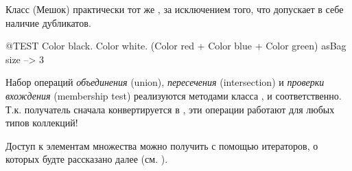 \documentclass[a4paper,10pt,twoside]{book}
\begin{document}
Класс  (Мешок) практически тот же , за исключением того, что допускает в себе наличие дубликатов.
\begin{code}{@TEST}
{ Color black. Color white. (Color red + Color blue + Color green) } asBag size --> 3
\end{code}

Набор операций \emph{объединения} (union), \emph{пересечения} (intersection) и \emph{проверки вхождения} (membership test) реализуются методами класса  ,  и  соответственно.
Т.к. получатель сначала конвертируется в , эти операции работают для любых типов коллекций!


Доступ к элементам множества можно получить с помощью итераторов, о которых будте рассказано далее (см. ).

\end{document}
